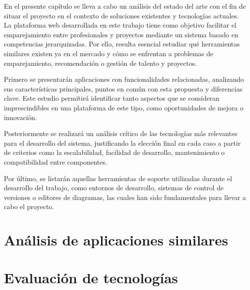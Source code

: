 
En el presente capítulo se lleva a cabo un análisis del estado del arte con el fin de situar el 
proyecto en el contexto de soluciones existentes y tecnologías actuales. La plataforma 
web desarrollada en este trabajo tiene como objetivo facilitar el emparejamiento entre 
profesionales y proyectos mediante un sistema basado en competencias jerarquizadas. 
Por ello, resulta esencial estudiar qué herramientas similares existen ya en el mercado 
y cómo se enfrentan a problemas de emparejamiento, recomendación o gestión de 
talento y proyectos.

Primero se presentarán aplicaciones con funcionalidades relacionadas, analizando sus 
características principales, puntos en común con esta propuesta y diferencias clave. 
Este estudio permitirá identificar tanto aspectos que se consideran imprescindibles en 
una plataforma de este tipo, como oportunidades de mejora o innovación.

Posteriormente se realizará un análisis crítico de las tecnologías más relevantes para el 
desarrollo del sistema, justificando la elección final en cada caso a partir de criterios 
como la escalabilidad, facilidad de desarrollo, mantenimiento o compatibilidad entre 
componentes.

Por último, se listarán aquellas herramientas de soporte utilizadas durante el desarrollo 
del trabajo, como entornos de desarrollo, sistemas de control de versiones o editores 
de diagramas, las cuales han sido fundamentales para llevar a cabo el proyecto.


\section{Análisis de aplicaciones similares}


\section{Evaluación de tecnologías}\label{sec:evaluacion-tecnologias}
